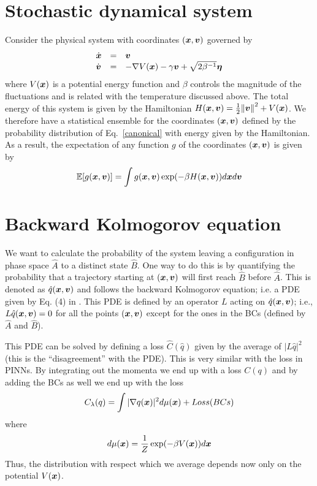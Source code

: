 \section{Stochastic dynamical system}
Consider the physical system with coordinates $(\boldsymbol{x},\boldsymbol{v})$ governed by
\begin{equation}
	\begin{array}{lcl} 
	\dot{\boldsymbol{x}} & = & \boldsymbol{v} \\ \dot{\boldsymbol{v}} & = & -\nabla V(\boldsymbol{x})-\gamma \boldsymbol{v} + \sqrt{2\beta^{-1}}\boldsymbol{\eta}
	\end{array}
\end{equation}
where $V(\boldsymbol{x})$ is a potential energy function and $\beta$ controls the magnitude of the fluctuations and is related with the temperature discussed above. 
The total energy of this system is given by the Hamiltonian $H(\boldsymbol{x},\boldsymbol{v}) = \frac{1}{2}\norm{\boldsymbol{v}}^2+V(\boldsymbol{x})$. 
We therefore have a statistical ensemble for the coordinates $(\boldsymbol{x},\boldsymbol{v})$ defined by the probability distribution of Eq.~\eqref{canonical} with energy given by the Hamiltonian. 
As a result, the expectation of any function $g$ of the coordinates $(\boldsymbol{x},\boldsymbol{v})$ is given by
\begin{equation}\label{average}
	\mathbb{E}[g(\boldsymbol{x},\boldsymbol{v})] = \int g(\boldsymbol{x},\boldsymbol{v}) \exp(-\beta H(\boldsymbol{x},\boldsymbol{v}))d\boldsymbol{x} d\boldsymbol{v}
\end{equation}

\section{Backward Kolmogorov equation}
We want to calculate the probability of the system leaving a configuration in phase space $\hat{A}$ to a distinct state $\hat{B}$. 
One way to do this is by quantifying the probability that a trajectory starting at $(\boldsymbol{x},\boldsymbol{v})$ will first reach $\hat{B}$ before $\hat{A}$. 
This is denoted as $\hat{q}(\boldsymbol{x},\boldsymbol{v})$ and follows the backward Kolmogorov equation; i.e. a PDE given by Eq. (4) in \textcite{rotskoff2020learning}. 
This PDE is defined by an operator $L$ acting on $\hat{q}(\boldsymbol{x},\boldsymbol{v})$; i.e., $L\hat{q}(\boldsymbol{x},\boldsymbol{v}) = 0$ for all the points $(\boldsymbol{x},\boldsymbol{v})$ except for the ones in the BCs (defined by $\hat{A}$ and $\hat{B}$).

This PDE can be solved by defining a loss $\hat{C}(\hat{q})$ given by the average of $|L\hat{q}|^2$ (this is the ``disagreement'' with the PDE). 
This is very similar with the loss in PINNs. 
By integrating out the momenta we end up with a loss $C(q)$ and by adding the BCs as well we end up with the loss
\begin{equation}\label{loss}
	C_{\lambda}(q) = \int |\nabla q(\boldsymbol{x})|^2d\mu(\boldsymbol{x}) + Loss(BCs)
\end{equation}
where 
\begin{equation}\label{distribution}
	d\mu(\boldsymbol{x}) = \frac{1}{Z}\exp(-\beta V(\boldsymbol{x}))d\boldsymbol{x}
\end{equation}
Thus, the distribution with respect which we average depends now only on the potential $V(\boldsymbol{x})$.

